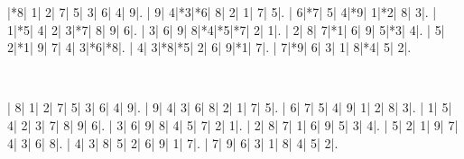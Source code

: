\documentclass{cons-beamer}
\begin{document}
\begin{frame}[fragile]
  \begin{center}
    \vspace{2mm}
    \PuzzleUnitlength=11pt
    \renewcommand*\SudokuLinethickness{1pt}
    \renewcommand*\PuzzleFont{\sf\tiny}
    \begin{Sudoku}
      |*8| 1| 2| 7| 5| 3| 6| 4| 9|.
      | 9| 4|*3|*6| 8| 2| 1| 7| 5|.
      | 6|*7| 5| 4|*9| 1|*2| 8| 3|.
      | 1|*5| 4| 2| 3|*7| 8| 9| 6|.
      | 3| 6| 9| 8|*4|*5|*7| 2| 1|.
      | 2| 8| 7|*1| 6| 9| 5|*3| 4|.
      | 5| 2|*1| 9| 7| 4| 3|*6|*8|.
      | 4| 3|*8|*5| 2| 6| 9|*1| 7|.
      | 7|*9| 6| 3| 1| 8|*4| 5| 2|.
    \end{Sudoku}
    ~~~~~
    \PuzzleSolution
    \begin{Sudoku}
      | 8| 1| 2| 7| 5| 3| 6| 4| 9|.
      | 9| 4| 3| 6| 8| 2| 1| 7| 5|.
      | 6| 7| 5| 4| 9| 1| 2| 8| 3|.
      | 1| 5| 4| 2| 3| 7| 8| 9| 6|.
      | 3| 6| 9| 8| 4| 5| 7| 2| 1|.
      | 2| 8| 7| 1| 6| 9| 5| 3| 4|.
      | 5| 2| 1| 9| 7| 4| 3| 6| 8|.
      | 4| 3| 8| 5| 2| 6| 9| 1| 7|.
      | 7| 9| 6| 3| 1| 8| 4| 5| 2|.
    \end{Sudoku}
  \end{center}
  \begin{example}
    \vspace{-0.5em}
    
    \vspace{-0.5em}
  \end{example}
\end{frame}
\end{document}
